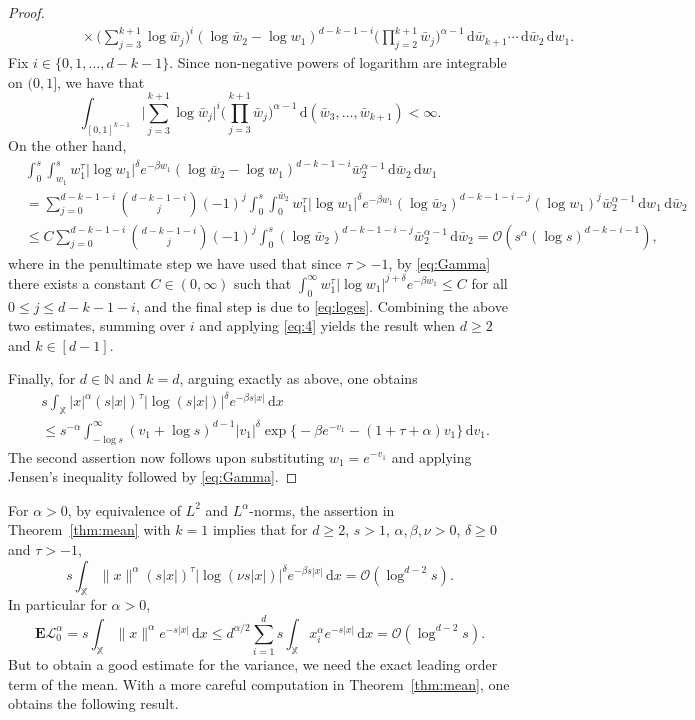 \documentclass[11pt,reqno]{amsart}
\numberwithin{equation}{section}
\theoremstyle{definition}
\newcommand{\E}{\mathbf{E}}
\newcommand{\N}{\mathbb{N}}
\newcommand{\XX}{\mathbb{X}}
\newcommand{\diff}{{\,\mathrm d}}
\begin{document}
\begin{proof}
\begin{align}
	& \qquad \qquad   \times \Big(\sum_{j=3}^{k+1}\log \bar w_j\Big)^i  (\log \bar w_2 - \log w_1)^{d-k-1-i}  \Big(\prod_{j=2}^{k+1} \bar w_j\Big)^{\alpha-1} \diff \bar w_{k+1}\cdots\diff \bar w_2 \diff w_1.
	\end{align}
	Fix $i \in\{0,1,\dots, d-k-1\}$. Since non-negative powers of logarithm are integrable on $(0,1]$, we have that 
	$$
	\int_{[0,1]^{k-1}} \Big|\sum_{j=3}^{k+1}\log \bar w_j\Big|^i \Big(\prod_{j=3}^{k+1} \bar w_j\Big)^{\alpha-1} \diff (\bar w_3,\dots,\bar w_{k+1})<\infty.
	$$
	On the other hand,
	\begin{align*}
		&\int_0^s \int_{w_1}^{s}
		w_1^{\tau}\Big| \log w_1 \Big|^\delta  e^{-\beta w_1}  (\log \bar w_2 - \log w_1)^{d-k-1-i}  \bar w_2^{\alpha-1} \diff \bar w_2 \diff w_1\\
		& = \sum_{j=0}^{d-k-1-i} \binom{d-k-1-i}{j}(-1)^j\int_0^s \int_{0}^{\bar w_2}
		w_1^{\tau}\Big| \log w_1 \Big|^\delta  e^{-\beta w_1}  (\log \bar w_2)^{d-k-1-i-j} (\log w_1)^{j}  \bar w_2^{\alpha-1} \diff w_1 \diff \bar w_2 \\
		&\le C \sum_{j=0}^{d-k-1-i} \binom{d-k-1-i}{j}(-1)^j\int_0^s
		(\log \bar w_2)^{d-k-1-i-j}  \bar w_2^{\alpha-1} \diff \bar w_2 =\mathcal{O}(s^{\alpha}(\log s)^{d-k-i-1}),
	\end{align*}
	where in the penultimate step we have used that since $\tau>-1$, by \eqref{eq:Gamma} there exists a constant $C \in (0,\infty)$ such that $\int_0^\infty w_1^{\tau} |\log w_1|^{j+\delta} e^{-\beta w_1} \le C$ for all $0 \le j \le d-k-1-i$, and the final step is due to \eqref{eq:loges}. Combining the above two estimates, summing over $i$ and applying \eqref{eq:4} yields the result when $d \ge 2$ and $k \in [d-1]$.
	
	Finally, for $d \in \N$ and $k=d$, arguing exactly as above, one obtains
	\begin{align*}
	&	s\int_{\XX} |x|^{\alpha} (s|x|)^{\tau}  \Big|\log (s |x|)\Big|^\delta  e^{-\beta s |x|} \diff x\\
	&\le s^{-\alpha} \int_{-\log s}^\infty (v_1+\log s)^{d-1} |v_1|^\delta  \exp\Big\{-\beta e^{- v_1} - (1+\tau+\alpha) v_1 \Big\}  \diff v_1.
\end{align*}
The second assertion now follows upon substituting $w_1=e^{-v_1}$ and applying Jensen's inequality followed by \eqref{eq:Gamma}.
\end{proof}

For $\alpha>0$, by equivalence of $L^2$ and $L^\alpha$-norms, the assertion in Theorem~\ref{thm:mean} with $k=1$ implies that for $d \ge 2$, $s>1$, $\alpha, \beta, \nu>0$, $\delta \ge 0$ and $\tau>-1$,
\begin{equation}\label{eq:3.1}
	s\int_{\XX} \|x\|^{\alpha} (s|x|)^{\tau}  \Big|\log (\nu s |x|)\Big|^\delta  e^{-\beta s |x|} \diff x=\mathcal{O}(\log^{d-2} s).
\end{equation}
In particular for $\alpha>0$,
$$
\E \mathscr{L}_0^{\alpha} =s\int_{\XX} \|x\|^\alpha e^{-s|x|} \diff x \le d^{\alpha/2} \sum_{i=1}^d s\int_{\XX} x_i^\alpha e^{-s|x|} \diff x=\mathcal{O}(\log^{d-2} s).
$$
But to obtain a good estimate for the variance, we need the exact leading order term of the mean. With a more careful computation in Theorem~\ref{thm:mean}, one obtains the following result. 
\end{document}
